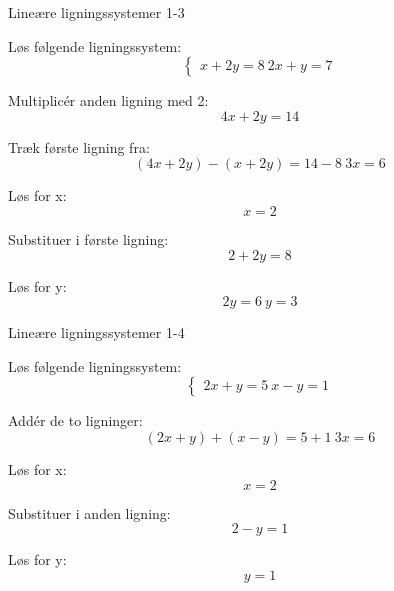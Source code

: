 \documentclass{article}
\begin{document}
\newpage

\begin{exercise}{Lineære ligningssystemer 1-3}

Løs følgende ligningssystem:
\[
\begin{cases}
 x + 2y = 8 \
 2x + y = 7
 \end{cases}
\]


\hint

Multiplicér anden ligning med 2:
\[
4x + 2y = 14
\]

\hint

Træk første ligning fra:
\[
(4x + 2y) - (x + 2y) = 14 - 8 \ 3x = 6
\]

\hint

Løs for x:
\[
x = 2
\]

\hint

Substituer i første ligning:
\[
2 + 2y = 8
\]

\hint

Løs for y:
\[
2y = 6 \ y = 3
\]

\end{exercise}

\newpage

\begin{exercise}{Lineære ligningssystemer 1-4}

Løs følgende ligningssystem:
\[
\begin{cases}
 2x + y = 5 \
 x - y = 1
 \end{cases}
\]


\hint

Addér de to ligninger:
\[
(2x + y) + (x - y) = 5 + 1 \ 3x = 6
\]

\hint

Løs for x:
\[
x = 2
\]

\hint

Substituer i anden ligning:
\[
2 - y = 1
\]

\hint

Løs for y:
\[
y = 1
\]

\end{exercise}
\end{document}

